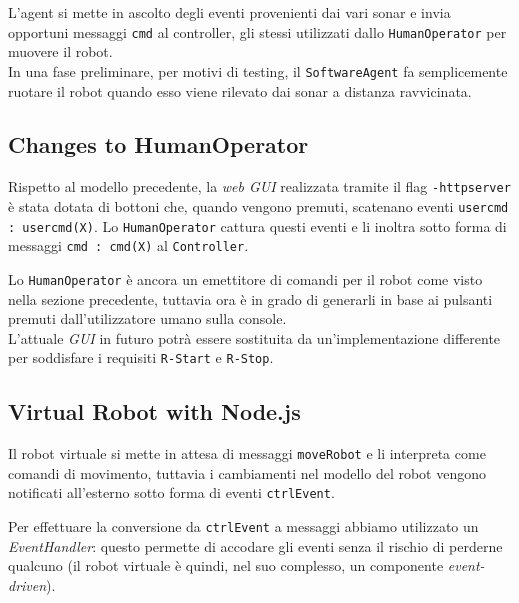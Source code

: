 \documentclass{../llncs}
\newcommand{\codescript}[1]{{\mbox{\small{\texttt{#1}}}}\xspace}
\newcommand{\code}[1]{{\color{blue}\small{\texttt{#1}}}}
\begin{document}
L'agent si mette in ascolto degli eventi provenienti dai vari sonar e invia opportuni messaggi \codescript{cmd} al controller, gli stessi utilizzati dallo \texttt{HumanOperator} per muovere il robot.\\

In una fase preliminare, per motivi di testing, il \texttt{SoftwareAgent} fa semplicemente ruotare il robot quando esso viene rilevato dai sonar a distanza ravvicinata.\\



\subsection{Changes to HumanOperator}
Rispetto al modello precedente, la \emph{web GUI} realizzata tramite il flag \codescript{-httpserver} è stata dotata di bottoni che, quando vengono premuti, scatenano eventi \codescript{usercmd : usercmd(X)}. Lo \texttt{HumanOperator} cattura questi eventi e li inoltra sotto forma di messaggi \codescript{cmd : cmd(X)} al \texttt{Controller}.

Lo \texttt{HumanOperator} è ancora un emettitore di comandi per il robot come visto nella sezione precedente, tuttavia ora è in grado di generarli in base ai pulsanti premuti dall'utilizzatore umano sulla console.\\



L'attuale \emph{GUI} in futuro potrà essere sostituita da un'implementazione differente per soddisfare i requisiti \code{R-Start} e \code{R-Stop}.

\subsection{Virtual Robot with Node.js}
Il robot virtuale si mette in attesa di messaggi \codescript{moveRobot} e li interpreta come comandi di movimento, tuttavia i cambiamenti nel modello del robot vengono notificati all'esterno sotto forma di eventi \codescript{ctrlEvent}.

Per effettuare la conversione da \codescript{ctrlEvent} a messaggi abbiamo utilizzato un \emph{EventHandler}: questo permette di accodare gli eventi senza il rischio di perderne qualcuno (il robot virtuale è quindi, nel suo complesso, un componente \emph{event-driven}).\\
\end{document}

